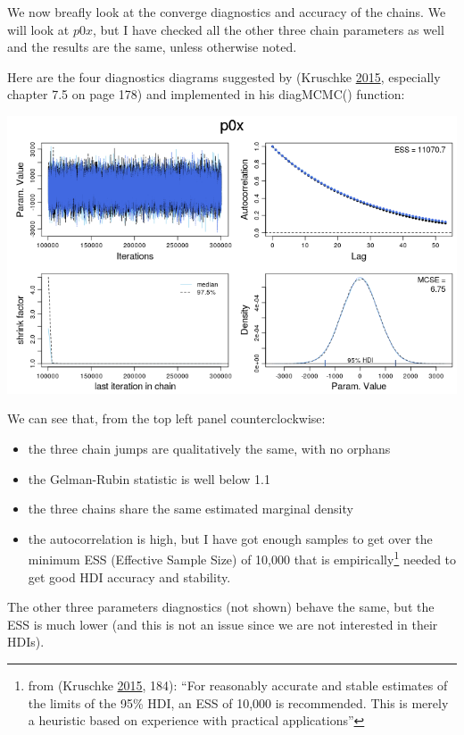 \documentclass[]{article}
\providecommand{\tightlist}{%
  \setlength{\itemsep}{0pt}\setlength{\parskip}{0pt}}
\begin{document}
We now breafly look at the converge diagnostics and accuracy of the
chains. We will look at \(p0x\), but I have checked all the other three
chain parameters as well and the results are the same, unless otherwise
noted.

Here are the four diagnostics diagrams suggested by (Kruschke
\protect\hyperlink{ref-DBDA2E}{2015}, especially chapter 7.5 on page
178) and implemented in his diagMCMC() function:

\begin{center}\includegraphics[width=1.0\textwidth]{bayesian_artillery_files/figure-latex/jags_convergence-1} \end{center}

We can see that, from the top left panel counterclockwise:

\begin{itemize}
\tightlist
\item
  the three chain jumps are qualitatively the same, with no orphans
\item
  the Gelman-Rubin statistic is well below 1.1
\item
  the three chains share the same estimated marginal density
\item
  the autocorrelation is high, but I have got enough samples to get over
  the minimum ESS (Effective Sample Size) of 10,000 that is
  empirically\footnote{from (Kruschke
    \protect\hyperlink{ref-DBDA2E}{2015}, 184): ``For reasonably
    accurate and stable estimates of the limits of the 95\% HDI, an ESS
    of 10,000 is recommended. This is merely a heuristic based on
    experience with practical applications''} needed to get good HDI
  accuracy and stability.
\end{itemize}

The other three parameters diagnostics (not shown) behave the same, but
the ESS is much lower (and this is not an issue since we are not
interested in their HDIs).
\end{document}
